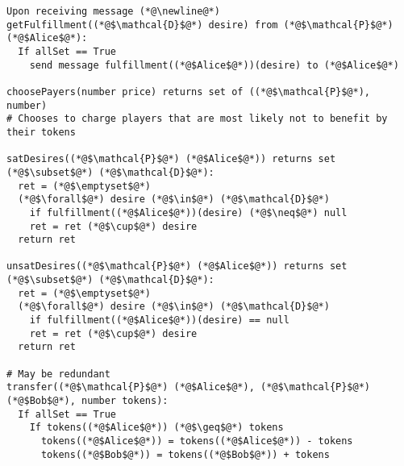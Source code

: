 \begin{lstlisting}[label=satfunc, style=numbers]
Upon receiving message (*@\newline@*) getFulfillment((*@$\mathcal{D}$@*) desire) from (*@$\mathcal{P}$@*) (*@$Alice$@*):
  If allSet == True
    send message fulfillment((*@$Alice$@*))(desire) to (*@$Alice$@*)

choosePayers(number price) returns set of ((*@$\mathcal{P}$@*), number)
# Chooses to charge players that are most likely not to benefit by their tokens

satDesires((*@$\mathcal{P}$@*) (*@$Alice$@*)) returns set (*@$\subset$@*) (*@$\mathcal{D}$@*):
  ret = (*@$\emptyset$@*)
  (*@$\forall$@*) desire (*@$\in$@*) (*@$\mathcal{D}$@*)
    if fulfillment((*@$Alice$@*))(desire) (*@$\neq$@*) null
    ret = ret (*@$\cup$@*) desire
  return ret

unsatDesires((*@$\mathcal{P}$@*) (*@$Alice$@*)) returns set (*@$\subset$@*) (*@$\mathcal{D}$@*):
  ret = (*@$\emptyset$@*)
  (*@$\forall$@*) desire (*@$\in$@*) (*@$\mathcal{D}$@*)
    if fulfillment((*@$Alice$@*))(desire) == null
    ret = ret (*@$\cup$@*) desire
  return ret

# May be redundant
transfer((*@$\mathcal{P}$@*) (*@$Alice$@*), (*@$\mathcal{P}$@*) (*@$Bob$@*), number tokens):
  If allSet == True
    If tokens((*@$Alice$@*)) (*@$\geq$@*) tokens
      tokens((*@$Alice$@*)) = tokens((*@$Alice$@*)) - tokens
      tokens((*@$Bob$@*)) = tokens((*@$Bob$@*)) + tokens
\end{lstlisting}
